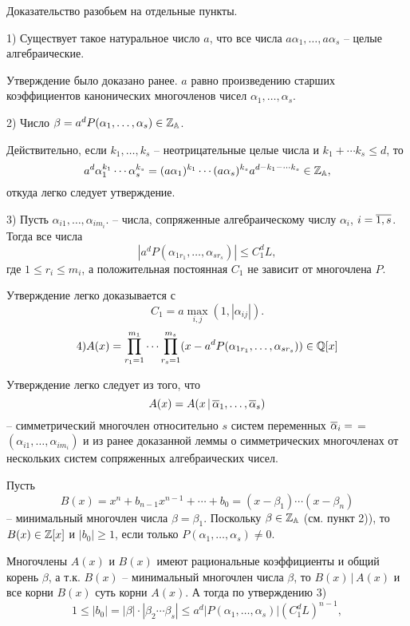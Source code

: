 Доказательство разобьем на отдельные пункты.
\vskip 5mm

1) Существует такое натуральное число $a$, что все числа
$a \alpha_1, \dots, a \alpha_s$ -- целые алгебраические.

Утверждение было доказано ранее. $a$ равно произведению старших коэффициентов
канонических многочленов чисел
$\alpha_1, \dots, \alpha_s$.
\vskip 5mm

2) Число $\beta = a^d P(\alpha_1, \dots, \alpha_s) \in \Bbb Z_{\Bbb A}$.

Действительно, если $k_1, \dots, k_s$ -- неотрицательные целые числа и
$k_1+ \cdots k_s \le d$, то
$$
a^d \alpha_1^{k_1} \cdots \alpha_s^{k_s} = (a \alpha_1)^{k_1} \cdots
(a \alpha_s)^{k_s}a^{d-k_1- \cdots k_s} \in \Bbb Z_{\Bbb A},
$$
откуда легко следует утверждение.
\vskip 5mm

3) Пусть
$\alpha_{i1}, \dots, \alpha_{im_i}$.
-- числа, сопряженные алгебраическому числу   $\alpha_i$, $i= \overline{1,s}$.
Тогда все числа
$$
|a^dP(\alpha_{1r_1}, \dots, \alpha_{sr_s})| \le C_1^d L,
$$
где $1 \le r_i \le m_i$, а положительная постоянная  $C_1$
не зависит от многочлена $P$.
\vskip 5mm

Утверждение легко доказывается с
$$ C_1= a \max_{i,j} (1, |\alpha_{ij}|).$$
$$
4) A(x)= \prod_{r_1=1}^{m_1} \cdots \prod_{r_s=1}^{m_s}
(x-a^dP(\alpha_{1r_1}, \dots, \alpha_{sr_s})) \in \Bbb Q [x]
$$

Утверждение легко следует из того, что
$$ A(x) = A(x \,| \, \overline {\alpha}_1, \dots, \overline {\alpha}_s) $$
-- симметрический многочлен относительно $s$  систем переменных
$\overline{\alpha}_i=$     \linebreak
=$ (\alpha_{i1}, \dots, \alpha_{im_i})$ и из ранее доказанной
леммы о симметрических многочленах от нескольких систем сопряженных
алгебраических чисел.

 Пусть
$$
B(x)= x^n+b_{n-1}x^{n-1}+ \cdots +b_0 = (x- \beta_1) \cdots (x- \beta_n)
$$
-- минимальный многочлен числа $\beta = \beta_1$. Поскольку
$\beta \in \Bbb Z_{\Bbb A}$ (см. пункт 2)), то $B(x) \in \Bbb Z [x]$ и
$|b_0| \ge 1$, если только $P(\alpha_1, \dots, \alpha_s) \ne 0$.

Многочлены $A(x)$  и $B(x)$  имеют рациональные коэффициенты и
общий корень $\beta$,  а т.к. $B(x)$ -- минимальный многочлен числа
$\beta$,    то $B(x) \,| \, A(x)$  и все корни $B(x)$  суть корни $A(x)$.
А тогда по утверждению 3)
$$
1 \le |b_0| = |\beta| \cdot |\beta_2 \cdots \beta_s| \le
a^d|P(\alpha_1, \dots, \alpha_s)| ( C_1^d L)^{n-1},
$$

